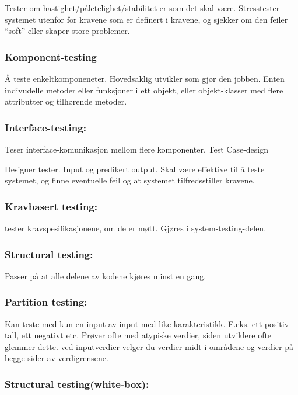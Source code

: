 \documentclass[11pt]{article}
\begin{document}
    Tester om hastighet/påletelighet/stabilitet er som det skal være. 
    Stresstester systemet utenfor for kravene som er definert i kravene, 
    og sjekker om den feiler ``soft'' eller skaper store problemer. 
\subsubsection{Komponent-testing}
\label{sec-9.2.3}


    Å teste enkeltkomponeneter. Hovedsaklig utvikler som gjør den jobben. 
    Enten indivudelle metoder eller funksjoner i ett objekt, eller objekt-klasser 
    med flere attributter og tilhørende metoder.
\subsubsection{Interface-testing:}
\label{sec-9.2.4}

    Teser interface-komunikasjon mellom flere komponenter.
    Test Case-design

    Designer tester. Input og predikert output. Skal være effektive til å teste systemet, og finne eventuelle feil og at systemet tilfredsstiller kravene.
\subsubsection{Kravbasert testing:}
\label{sec-9.2.5}

    tester kravspesifikasjonene, om de er møtt. Gjøres i system-testing-delen.
\subsubsection{Structural testing:}
\label{sec-9.2.6}

    Passer på at alle delene av kodene kjøres minst en gang.
\subsubsection{Partition testing:}
\label{sec-9.2.7}

    Kan teste med kun en input av input med like karakteristikk. F.eks. ett positiv tall, 
    ett negativt etc. Prøver ofte med atypiske verdier, siden utviklere ofte glemmer dette. 
    ved inputverdier velger du verdier midt i områdene og verdier på begge sider av verdigrensene.
\subsubsection{Structural testing(white-box):}
\label{sec-9.2.8}
\end{document}
